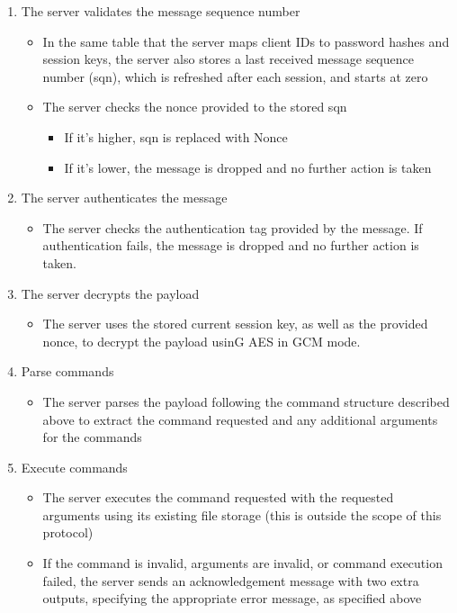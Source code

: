 \documentclass[12pt]{article}
\begin{document}
\begin{enumerate}
    \item The server validates the message sequence number
    \begin{itemize}
        \item In the same table that the server maps client IDs to password hashes and session keys, the server also stores a last received message sequence number (sqn), which is refreshed after each session, and starts at zero
        \item The server checks the nonce provided to the stored sqn
        \begin{itemize}
            \item If it’s higher, sqn is replaced with Nonce
            \item If it’s lower, the message is dropped and no further action is taken
        \end{itemize}
    \end{itemize}
    \item The server authenticates the message
    \begin{itemize}
        \item The server checks the authentication tag provided by the message. If authentication fails, the message is dropped and no further action is taken.
    \end{itemize}
    \item The server decrypts the payload
    \begin{itemize}
        \item The server uses the stored current session key, as well as the provided nonce, to decrypt the payload usinG AES in GCM mode.
    \end{itemize}
    \item Parse commands
    \begin{itemize}
        \item The server parses the payload following the command structure described above to extract the command requested and any additional arguments for the commands
    \end{itemize}
    \item Execute commands
    \begin{itemize}
        \item The server executes the command requested with the requested arguments using its existing file storage (this is outside the scope of this protocol)
        \item If the command is invalid, arguments are invalid, or command execution failed, the server sends an acknowledgement message with two extra outputs, specifying the appropriate error message, as specified above

\end{itemize}
\end{enumerate}
\end{document}
